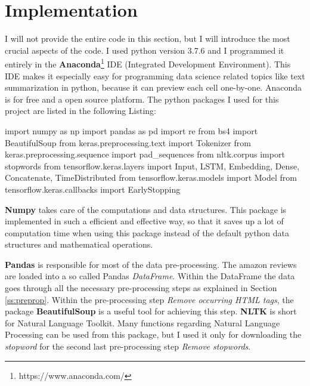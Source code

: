 \section{Implementation}\label{ss:imp}

I will not provide the entire code in this section, but I will introduce the most crucial aspects of the code. I used python version 3.7.6 and I programmed it entirely in the \textbf{Anaconda}\footnote{https://www.anaconda.com/} IDE (Integrated Development Environment). This IDE makes it especially easy for programming data science related topics like text summarization in python, because it can preview each cell one-by-one. Anaconda is for free and a open source platform. The python packages I used for this project are listed in the following Listing:

\begin{python}
import numpy as np  
import pandas as pd 
import re           
from bs4 import BeautifulSoup 
from keras.preprocessing.text import Tokenizer 
from keras.preprocessing.sequence import pad_sequences
from nltk.corpus import stopwords   
from tensorflow.keras.layers import Input, LSTM, Embedding, Dense, Concatenate, TimeDistributed
from tensorflow.keras.models import Model
from tensorflow.keras.callbacks import EarlyStopping
\end{python}

\textbf{Numpy} takes care of the computations and data structures. This package is implemented in such a efficient and effective way, so that it saves up a lot of computation time when using this package instead of the default python data structures and mathematical operations.

\textbf{Pandas} is responsible for most of the data pre-processing. The amazon reviews are loaded into a so called Pandas \textit{DataFrame}. Within the DataFrame the data goes through all the necessary pre-processing steps as explained in Section \ref{ss:preprop}. Within the pre-processing step \textit{Remove occurring HTML tags}, the package \textbf{BeautifulSoup} is a useful tool for achieving this step. \textbf{NLTK} is short for Natural Language Toolkit. Many functions regarding Natural Language Processing can be used from this package, but I used it only for downloading the \textit{stopword} for the second last pre-processing step \textit{Remove stopwords}.


